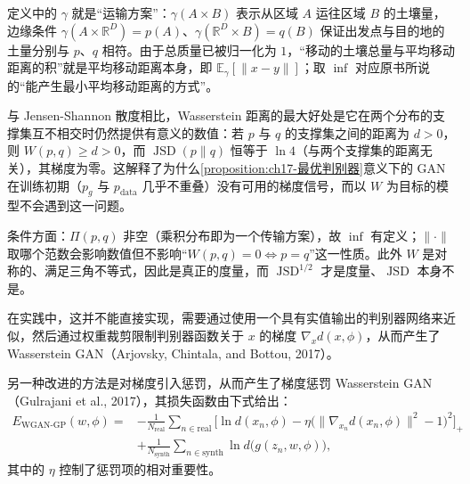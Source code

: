 \documentclass[../../main.tex]{subfiles}
\begin{document}
\begin{remark}
定义中的 $\gamma$ 就是“运输方案”：$\gamma(A\times B)$ 表示从区域 $A$ 运往区域 $B$ 的土壤量，边缘条件 $\gamma(A\times\mathbb{R}^D)=p(A)$、$\gamma(\mathbb{R}^D\times B)=q(B)$ 保证出发点与目的地的土量分别与 $p$、$q$ 相符。由于总质量已被归一化为 $1$，“移动的土壤总量与平均移动距离的积”就是平均移动距离本身，即 $\mathbb{E}_\gamma[\|x-y\|]$；取 $\inf$ 对应原书所说的“能产生最小平均移动距离的方式”。

与 Jensen-Shannon 散度相比，Wasserstein 距离的最大好处是它在两个分布的支撑集互不相交时仍然提供有意义的数值：若 $p$ 与 $q$ 的支撑集之间的距离为 $d>0$，则 $W(p,q)\geqslant d>0$，而 $\operatorname{JSD}(p\|q)$ 恒等于 $\ln 4$（与两个支撑集的距离无关），其梯度为零。这解释了为什么\cref{proposition:ch17-最优判别器}意义下的 GAN 在训练初期（$p_g$ 与 $p_{\mathrm{data}}$ 几乎不重叠）没有可用的梯度信号，而以 $W$ 为目标的模型不会遇到这一问题。

条件方面：$\Pi(p,q)$ 非空（乘积分布即为一个传输方案），故 $\inf$ 有定义；$\|\cdot\|$ 取哪个范数会影响数值但不影响“$W(p,q)=0\iff p=q$”这一性质。此外 $W$ 是对称的、满足三角不等式，因此是真正的度量，而 $\operatorname{JSD}^{1/2}$ 才是度量、$\operatorname{JSD}$ 本身不是。
\end{remark}

在实践中，这并不能直接实现，需要通过使用一个具有实值输出的判别器网络来近似，然后通过权重裁剪限制判别器函数关于 $x$ 的梯度 $\nabla_x d(x,\phi)$，从而产生了 Wasserstein GAN（Arjovsky, Chintala, and Bottou, 2017）。

另一种改进的方法是对梯度引入惩罚，从而产生了梯度惩罚 Wasserstein GAN（Gulrajani et al., 2017），其损失函数由下式给出：
\begin{align}
E_{\mathrm{WGAN}\text{-}\mathrm{GP}}(w,\phi)={}&-\frac{1}{N_{\mathrm{real}}}\sum_{n\in\mathrm{real}}\Big[\ln d(x_n,\phi)-\eta\big(\|\nabla_{x_n}d(x_n,\phi)\|^{2}-1\big)^{2}\Big]_{+}\nonumber\\
&+\frac{1}{N_{\mathrm{synth}}}\sum_{n\in\mathrm{synth}}\ln d\big(g(z_n,w,\phi)\big),
\label{align:ch17-WGAN-GP}
\end{align}
其中的 $\eta$ 控制了惩罚项的相对重要性。
\end{document}
